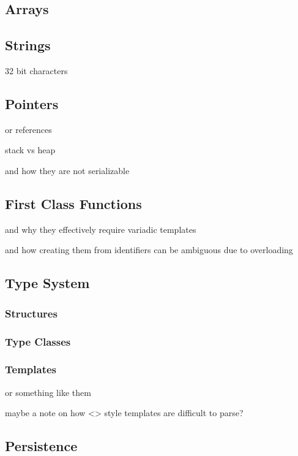         \subsection{Arrays}
        
        \subsection{Strings}
            32 bit characters
        
        \subsection{Pointers}
            or references
            
            stack vs heap
            
            and how they are not serializable
        
        \subsection{First Class Functions}
            and why they effectively require variadic templates
            
            and how creating them from identifiers can be ambiguous due to overloading
        
        \subsection{Type System}
            \subsubsection{Structures}
            \subsubsection{Type Classes}
            \subsubsection{Templates}
                or something like them
                
                maybe a note on how <> style templates are difficult to parse?
        
        \subsection{Persistence}
        
